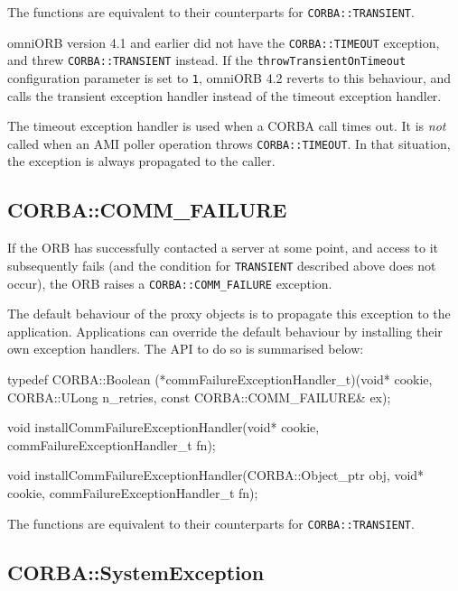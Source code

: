 \documentclass[11pt,twoside,a4paper]{book}
\newcommand{\code}[1]{\texttt{#1}}
\newcommand{\dsc}{\discretionary{}{}{}}
\begin{document}
The functions are equivalent to their counterparts for
\code{CORBA::TRANSIENT}.

omniORB version 4.1 and earlier did not have the \code{CORBA::TIMEOUT}
exception, and threw \code{CORBA::TRANSIENT} instead. If the
\code{throwTransientOnTimeout} configuration parameter is set to
\code{1}, omniORB 4.2 reverts to this behaviour, and calls the
transient exception handler instead of the timeout exception handler.

The timeout exception handler is used when a CORBA call times out. It
is \emph{not} called when an AMI poller operation throws
\code{CORBA::TIMEOUT}. In that situation, the exception is always
propagated to the caller.



\subsection{CORBA::COMM\_FAILURE}

If the ORB has successfully contacted a server at some point, and
access to it subsequently fails (and the condition for
\code{TRANSIENT} described above does not occur), the ORB raises a
\code{CORBA::COMM\_\dsc{}FAILURE} exception.

The default behaviour of the proxy objects is to propagate this
exception to the application. Applications can override the default
behaviour by installing their own exception handlers. The API to do so
is summarised below:

\begin{cxxlisting}
typedef CORBA::Boolean
(*commFailureExceptionHandler_t)(void* cookie,
                                 CORBA::ULong n_retries,
                                 const CORBA::COMM_FAILURE& ex);

void
installCommFailureExceptionHandler(void* cookie,
                                   commFailureExceptionHandler_t fn);

void
installCommFailureExceptionHandler(CORBA::Object_ptr obj,
                                   void* cookie,
                                   commFailureExceptionHandler_t fn);
\end{cxxlisting}

The functions are equivalent to their counterparts for
\code{CORBA::TRANSIENT}.


\subsection{CORBA::SystemException}
\end{document}
